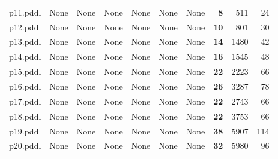 \documentclass{article}
\begin{document}
\begin{tabular}{@{}lrrrrrrrrr@{}}
p11.pddl & \multicolumn{1}{|l|}{None} & \multicolumn{1}{|l|}{None} & \multicolumn{1}{|l|}{None} & \multicolumn{1}{|l|}{None} & \multicolumn{1}{|l|}{None} & \multicolumn{1}{|l|}{None} & \textbf{8} & 511 & 24 \\
p12.pddl & \multicolumn{1}{|l|}{None} & \multicolumn{1}{|l|}{None} & \multicolumn{1}{|l|}{None} & \multicolumn{1}{|l|}{None} & \multicolumn{1}{|l|}{None} & \multicolumn{1}{|l|}{None} & \textbf{10} & 801 & 30 \\
p13.pddl & \multicolumn{1}{|l|}{None} & \multicolumn{1}{|l|}{None} & \multicolumn{1}{|l|}{None} & \multicolumn{1}{|l|}{None} & \multicolumn{1}{|l|}{None} & \multicolumn{1}{|l|}{None} & \textbf{14} & 1480 & 42 \\
p14.pddl & \multicolumn{1}{|l|}{None} & \multicolumn{1}{|l|}{None} & \multicolumn{1}{|l|}{None} & \multicolumn{1}{|l|}{None} & \multicolumn{1}{|l|}{None} & \multicolumn{1}{|l|}{None} & \textbf{16} & 1545 & 48 \\
p15.pddl & \multicolumn{1}{|l|}{None} & \multicolumn{1}{|l|}{None} & \multicolumn{1}{|l|}{None} & \multicolumn{1}{|l|}{None} & \multicolumn{1}{|l|}{None} & \multicolumn{1}{|l|}{None} & \textbf{22} & 2223 & 66 \\
p16.pddl & \multicolumn{1}{|l|}{None} & \multicolumn{1}{|l|}{None} & \multicolumn{1}{|l|}{None} & \multicolumn{1}{|l|}{None} & \multicolumn{1}{|l|}{None} & \multicolumn{1}{|l|}{None} & \textbf{26} & 3287 & 78 \\
p17.pddl & \multicolumn{1}{|l|}{None} & \multicolumn{1}{|l|}{None} & \multicolumn{1}{|l|}{None} & \multicolumn{1}{|l|}{None} & \multicolumn{1}{|l|}{None} & \multicolumn{1}{|l|}{None} & \textbf{22} & 2743 & 66 \\
p18.pddl & \multicolumn{1}{|l|}{None} & \multicolumn{1}{|l|}{None} & \multicolumn{1}{|l|}{None} & \multicolumn{1}{|l|}{None} & \multicolumn{1}{|l|}{None} & \multicolumn{1}{|l|}{None} & \textbf{22} & 3753 & 66 \\
p19.pddl & \multicolumn{1}{|l|}{None} & \multicolumn{1}{|l|}{None} & \multicolumn{1}{|l|}{None} & \multicolumn{1}{|l|}{None} & \multicolumn{1}{|l|}{None} & \multicolumn{1}{|l|}{None} & \textbf{38} & 5907 & 114 \\
p20.pddl & \multicolumn{1}{|l|}{None} & \multicolumn{1}{|l|}{None} & \multicolumn{1}{|l|}{None} & \multicolumn{1}{|l|}{None} & \multicolumn{1}{|l|}{None} & \multicolumn{1}{|l|}{None} & \textbf{32} & 5980 & 96 \\
\end{tabular}
\end{document}
